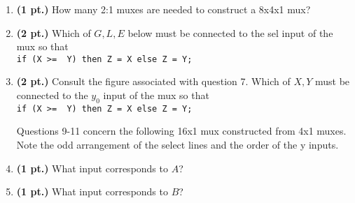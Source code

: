 \documentclass{article}
\begin{document}
\begin{enumerate}
\item {\bf (1 pt.)} How many 2:1 muxes are needed to construct a 8x4x1 mux?

\item {\bf (2 pt.)} Which of $G,L,E$ below must be connected to the
sel input of the mux so that \\
\verb+if (X >=  Y) then Z = X else Z = Y;+



\pagebreak
\item {\bf (2 pt.)} Consult the figure associated with question
7.  Which of $X,Y$ must be connected to the
$y_0$ input of the mux so that \\
\verb+if (X >=  Y) then Z = X else Z = Y;+


Questions 9-11 concern the following 16x1 mux constructed from 4x1 muxes.  
Note the odd arrangement of the select lines and the order of the y inputs.


\item {\bf (1 pt.)} What input corresponds to $A$?

\item {\bf (1 pt.)} What input corresponds to $B$?


\end{enumerate}
\end{document}
